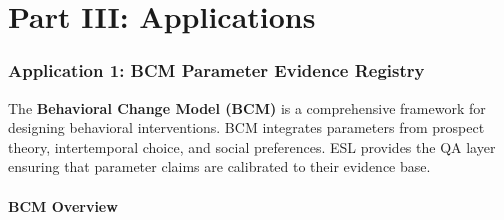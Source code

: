 \documentclass[11pt,a4paper]{article}
\begin{document}

\part*{Part III: Applications}

\begin{center}
\end{center}

\vspace{1em}

\section{Application 1: BCM Parameter Evidence Registry}
\label{sec:application-bcm}


The \textbf{Behavioral Change Model (BCM)} is a comprehensive framework for designing behavioral interventions. BCM integrates parameters from prospect theory, intertemporal choice, and social preferences. ESL provides the QA layer ensuring that parameter claims are calibrated to their evidence base.

\subsection{BCM Overview}
\end{document}
